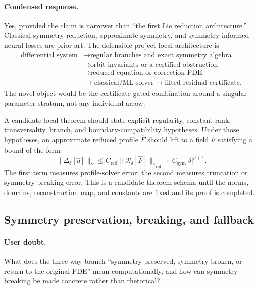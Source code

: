 \documentclass[11pt]{article}
\begin{document}
\paragraph{Condensed response.}
Yes, provided the claim is narrower than ``the first Lie reduction
architecture.''  Classical symmetry reduction, approximate symmetry, and
symmetry-informed neural losses are prior art.  The defensible project-local
architecture is
\[
\begin{aligned}
 \text{differential system}
 &\longrightarrow \text{regular branches and exact symmetry algebra}\\
 &\longrightarrow \text{orbit invariants or a certified obstruction}\\
 &\longrightarrow \text{reduced equation or correction PDE}\\
 &\longrightarrow \text{classical/ML solver}
 \longrightarrow \text{lifted residual certificate}.
\end{aligned}
\]
The novel object would be the certificate-gated combination around a singular
parameter stratum, not any individual arrow.

A candidate local theorem should state explicit regularity, constant-rank,
transversality, branch, and boundary-compatibility hypotheses.  Under those
hypotheses, an approximate reduced profile $\widehat F$ should lift to a field
$\widehat u$ satisfying a bound of the form
\[
 \|\Delta_\delta[\widehat u]\|_Y
 \le C_{\mathrm{red}}
       \|\mathcal R_\delta[\widehat F]\|_{Y_{\mathrm{red}}}
    + C_{\mathrm{sym}}|\delta|^{p+1}.
\]
The first term measures profile-solver error; the second measures truncation or
symmetry-breaking error.  This is a candidate theorem schema until the norms,
domains, reconstruction map, and constants are fixed and its proof is completed.

\subsection{Symmetry preservation, breaking, and fallback}

\paragraph{User doubt.}
What does the three-way branch ``symmetry preserved, symmetry broken, or return
to the original PDE'' mean computationally, and how can symmetry breaking be
made concrete rather than rhetorical?
\end{document}

